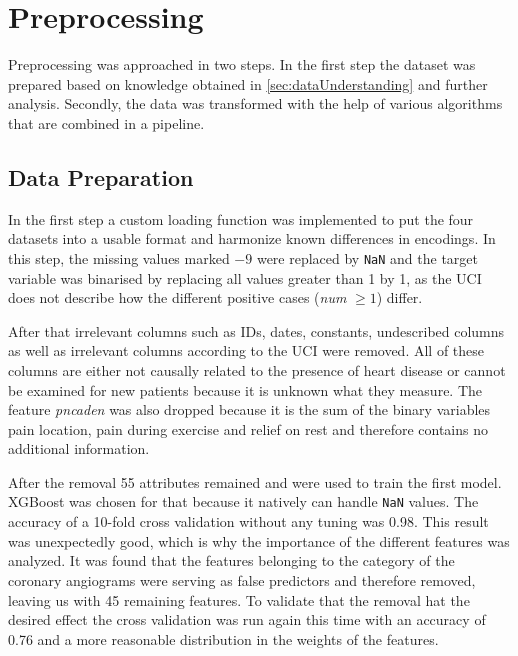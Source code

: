 




\section{Preprocessing} \label{sec:preprocessing}

Preprocessing was approached in two steps. In the first step the dataset was prepared based on knowledge obtained in \cref{sec:dataUnderstanding} and further analysis. 
Secondly, the data was transformed with the help of various algorithms that are combined in a pipeline. 

\subsection{Data Preparation}
In the first step a custom loading function was implemented to put the four datasets into a usable format and harmonize known differences in encodings. In this step, the missing values marked \texttt{$-9$} were replaced by \texttt{NaN} and the target variable was binarised by replacing all values greater than 1 by 1, as the UCI does not describe how the different positive cases (\textit{num} $\geq 1$) differ.

After that irrelevant columns such as IDs, dates, constants, undescribed columns as well as irrelevant columns according to the UCI were removed. All of these columns are either not causally related to the presence of heart disease or cannot be examined for new patients because it is unknown what they measure. The feature \textit{pncaden} was also dropped because it is the sum of the binary variables pain location, pain during exercise and relief on rest and therefore contains no additional information. 

After the removal 55 attributes remained and were used to train the first model. XGBoost was chosen for that because it natively can handle \texttt{NaN} values. The accuracy of a 10-fold cross validation without any tuning was 0.98. This result was unexpectedly good, which is why   the importance of the different features was analyzed. It was found that the features belonging to the category of the coronary angiograms were serving as false predictors and therefore removed, leaving us with 45 remaining features. To validate that the removal hat the desired effect the cross validation was run again this time with an accuracy of 0.76 and a more reasonable distribution in the weights of the features.   

